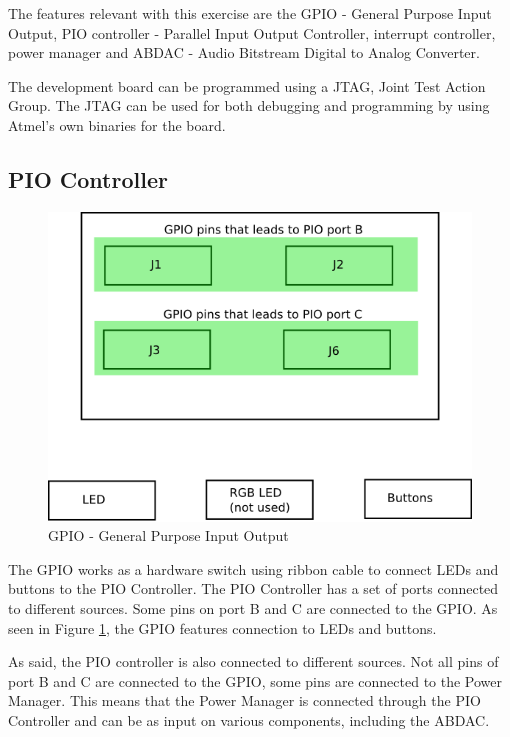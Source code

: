 \documentclass[12pt,a4paper,final]{report}
\numberwithin{equation}{section}
\numberwithin{table}{section}
\numberwithin{figure}{section}
\begin{document}
The features relevant with this exercise are the GPIO - General Purpose Input Output, PIO controller - Parallel Input Output Controller, interrupt controller, power manager and ABDAC - Audio Bitstream Digital to Analog Converter.

The development board can be programmed using a JTAG, Joint Test Action Group. The JTAG can be used for both debugging and programming by using Atmel's own binaries for the board. 

\subsection{PIO Controller}
\label{sec:pio}

\begin{figure}[H]
\centering
\includegraphics[scale=0.5]{gpio}
\caption{GPIO - General Purpose Input Output}
\label{fig:gpio}
\end{figure}

The GPIO works as a hardware switch using ribbon cable to connect LEDs and buttons to the PIO Controller. The PIO Controller has a set of ports connected to different sources. Some pins on port B and C are connected to the GPIO. As seen in Figure \ref{fig:gpio}, the GPIO features connection to LEDs and buttons.

As said, the PIO controller is also connected to different sources. Not all pins of port B and C are connected to the GPIO, some pins are connected to the Power Manager. This means that the Power Manager is connected through the PIO Controller and can be as input on various components, including the ABDAC.
\end{document}
